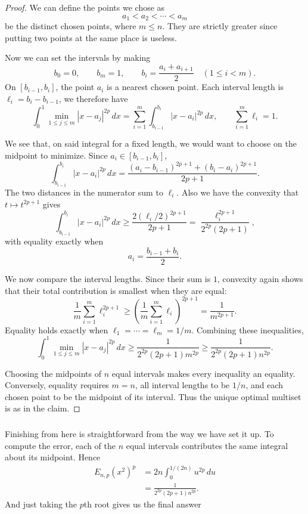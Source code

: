 \documentclass[11pt]{scrartcl}
\begin{document}
\begin{soln}
\begin{proof}
    We can define the points we chose as
    \[
    a_1<a_2<\cdots<a_m
    \]
    be the distinct chosen points, where $m\le n$. 
    They are strictly greater since putting two points at the same place is useless. 
    
	Now we can set the intervals by making
    \[
    b_0=0,\qquad b_m=1,\qquad
    b_i=\frac{a_i+a_{i+1}}2
    \quad (1\le i<m).
    \]
    On $[b_{i-1},b_i]$, the point $a_i$ is a nearest chosen point.
    Each interval length is $\ell_i=b_i-b_{i-1}$, we therefore have
    \[
    \int_0^1\min_{1\le j\le m}|x-a_j|^{2p}\,dx
    =
    \sum_{i=1}^m
    \int_{b_{i-1}}^{b_i}|x-a_i|^{2p}\,dx,
    \qquad
    \sum_{i=1}^m\ell_i=1.
    \]

    We see that, on said integral for a fixed length, we would want to choose on the midpoint
    to minimize. Since
    $a_i\in[b_{i-1},b_i]$,
    \[
    \int_{b_{i-1}}^{b_i}|x-a_i|^{2p}\,dx
    =
    \frac{(a_i-b_{i-1})^{2p+1}
          +(b_i-a_i)^{2p+1}}{2p+1}.
    \]
    The two distances in the numerator sum to $\ell_i$.
    Also we have the convexity that $t\mapsto t^{2p+1}$ gives
    \[
    \int_{b_{i-1}}^{b_i}|x-a_i|^{2p}\,dx
    \ge
    \frac{2(\ell_i/2)^{2p+1}}{2p+1}
    =
    \frac{\ell_i^{2p+1}}{2^{2p}(2p+1)},
    \]
    with equality exactly when
    \[
    a_i=\frac{b_{i-1}+b_i}{2}.
    \]

    We now compare the interval lengths. Since their sum is $1$,
    convexity again shows that their total contribution is smallest
    when they are equal:
    \[
    \frac1m\sum_{i=1}^m\ell_i^{2p+1}
    \ge
    \left(\frac1m\sum_{i=1}^m\ell_i\right)^{2p+1}
    =
    \frac1{m^{2p+1}}.
    \]
    Equality holds exactly when
    $\ell_1=\cdots=\ell_m=1/m$. Combining these inequalities,
    \[
    \int_0^1\min_{1\le j\le m}|x-a_j|^{2p}\,dx
    \ge
    \frac{1}{2^{2p}(2p+1)m^{2p}}
    \ge
    \frac{1}{2^{2p}(2p+1)n^{2p}}.
    \]

    Choosing the midpoints of $n$ equal intervals makes every
    inequality an equality. Conversely, equality requires $m=n$,
    all interval lengths to be $1/n$, and each chosen point to be
    the midpoint of its interval. Thus the unique optimal multiset is as in the claim.
	\end{proof}
    \subsubsection*{}
	Finishing from here is straightforward from the way we have set it up.
	 To compute the error,
    each of the $n$ equal intervals contributes the same integral
    about its midpoint. Hence
    \begin{align*}
        E_{n,p}(x^2)^p
        &=2n\int_0^{1/(2n)}u^{2p}\,du\\
        &=\frac{1}{2^{2p}(2p+1)n^{2p}}.
    \end{align*}
	And just taking the $p$th root gives us the final answer
	
\end{soln}
\end{document}
